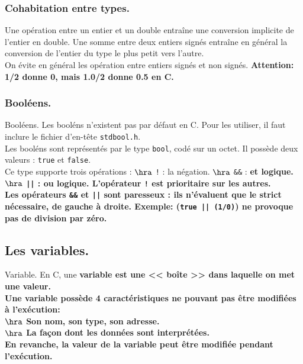 \documentclass[french, 11pt]{article}
\begin{document}
\subsubsection{Cohabitation entre types.}

\begin{defi}{}{}
    Une opération entre un entier et un double entraîne une conversion implicite de l'entier en double. Une somme entre deux entiers signés entraîne en général la conversion de l'entier du type le plus petit vers l'autre.\\
    On évite en général les opération entre entiers signés et non signés.\n
    \bf{Attention:} 1/2 donne 0, mais 1.0/2 donne 0.5 en C.
\end{defi}

\subsubsection{Booléens.}
\begin{defi}{Booléens.}{}
    Les booléns n'existent pas par défaut en C. Pour les utiliser, il faut inclure le fichier d'en-tête \texttt{stdbool.h}.\\
    Les booléns sont représentés par le type \texttt{bool}, codé sur un octet. Il possède deux valeurs : \texttt{true} et \texttt{false}.\\
    Ce type supporte trois opérations :
    $\hra$ \texttt{!} : la négation.
    $\hra$ \texttt{\&\&} : \bf{et} logique.
    $\hra$ \texttt{||} : \bf{ou} logique.
    L'opérateur \texttt{!} est prioritaire sur les autres.\\
    Les opérateurs \texttt{\&\&} et \texttt{||} sont paresseux : ils n'évaluent que le strict nécessaire, de gauche à droite.\n
    \bf{Exemple:} (\texttt{true || (1/0)}) ne provoque pas de division par zéro.
\end{defi}

\subsection{Les variables.}

\begin{defi}{Variable.}{}
    En C, une \bf{variable} est une << boîte >> dans laquelle on met une valeur.\\
    Une variable possède 4 caractéristiques ne pouvant pas être modifiées à l'exécution:\\
    $\hra$ Son nom, son type, son adresse.\\
    $\hra$ La façon dont les données sont interprétées.\\
    En revanche, la valeur de la variable peut être modifiée pendant l'exécution.
\end{defi}
\end{document}
